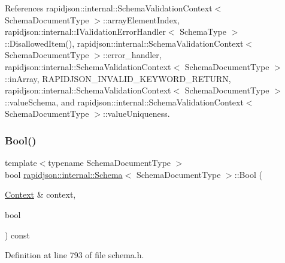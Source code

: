 References rapidjson\+::internal\+::\+Schema\+Validation\+Context$<$ Schema\+Document\+Type $>$\+::array\+Element\+Index, rapidjson\+::internal\+::\+I\+Validation\+Error\+Handler$<$ Schema\+Type $>$\+::\+Disallowed\+Item(), rapidjson\+::internal\+::\+Schema\+Validation\+Context$<$ Schema\+Document\+Type $>$\+::error\+\_\+handler, rapidjson\+::internal\+::\+Schema\+Validation\+Context$<$ Schema\+Document\+Type $>$\+::in\+Array, R\+A\+P\+I\+D\+J\+S\+O\+N\+\_\+\+I\+N\+V\+A\+L\+I\+D\+\_\+\+K\+E\+Y\+W\+O\+R\+D\+\_\+\+R\+E\+T\+U\+RN, rapidjson\+::internal\+::\+Schema\+Validation\+Context$<$ Schema\+Document\+Type $>$\+::value\+Schema, and rapidjson\+::internal\+::\+Schema\+Validation\+Context$<$ Schema\+Document\+Type $>$\+::value\+Uniqueness.

\mbox{\label{classrapidjson_1_1internal_1_1_schema_a6ebaf1a26034d6d2a013f724a4499647}} 
\subsubsection{\texorpdfstring{Bool()}{Bool()}}
{\footnotesize\ttfamily template$<$typename Schema\+Document\+Type $>$ \\
bool \mbox{\hyperlink{classrapidjson_1_1internal_1_1_schema}{rapidjson\+::internal\+::\+Schema}}$<$ Schema\+Document\+Type $>$\+::Bool (\begin{DoxyParamCaption}\item[{\mbox{\hyperlink{classrapidjson_1_1internal_1_1_schema_afca06b1f51d1bc18403bdf3f4d55ffef}{Context}} \&}]{context,  }\item[{bool}]{ }\end{DoxyParamCaption}) const}



Definition at line 793 of file schema.\+h.


